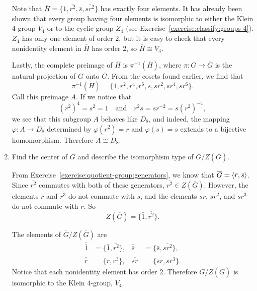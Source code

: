 \begin{enumerate}
\begin{solution}
    Note that
    $\overline{H} = \{1, \overline{r^2}, \bar{s}, \overline{sr^2}\}$
    has exactly four elements. It has already been shown that every
    group having four elements is isomorphic to either the Klein
    4-group $V_4$ or to the cyclic group $Z_4$ (see
    Exercise~\ref{exercise:classify:groups-4}). $Z_4$ has only one
    element of order $2$, but it is easy to check that every
    nonidentity element in $\overline{H}$ has order $2$, so
    $\overline{H}\cong V_4$.

    Lastly, the complete preimage of $\overline{H}$ is
    $\pi^{-1}(\overline{H})$, where $\pi\colon G\to\overline{G}$ is
    the natural projection of $G$ onto $\overline{G}$. From the cosets
    found earlier, we find that
    \begin{equation*}
      \pi^{-1}(\overline{H})
      = \{1, r^2, r^4, r^6, s, sr^2, sr^4, sr^6\}.
    \end{equation*}
    Call this preimage $A$. If we notice that
    \begin{equation*}
      (r^2)^4 = s^2 = 1
      \quad\text{and}\quad
      r^2s = sr^{-2} = s(r^2)^{-1},
    \end{equation*}
    we see that this subgroup $A$ behaves like $D_8$, and indeed, the
    mapping $\varphi\colon A\to D_8$ determined by $\varphi(r^2) = r$
    and $\varphi(s) = s$ extends to a bijective
    homomorphism. Therefore $A\cong D_8$.
  \end{solution}
\item Find the center of $\overline{G}$ and describe the isomorphism
  type of $\overline{G}/Z(\overline{G})$.
  \begin{solution}
    From Exercise~\ref{exercise:quotient-group:generators}, we know
    that $\overline{G} = \langle{\bar{r}, \bar{s}}\rangle$. Since
    $\overline{r^2}$ commutes with both of these generators,
    $\overline{r^2}\in Z(\overline{G})$. However, the elements
    $\bar{r}$ and $\overline{r^3}$ do not commute with $s$, and the
    elements $\overline{sr}$, $\overline{sr^2}$, and $\overline{sr^3}$
    do not commute with $r$. So
    \begin{equation*}
      Z(\overline{G}) = \{ \bar1, \overline{r^2} \}.
    \end{equation*}

    The elements of $\overline{G}/Z(\overline{G})$ are
    \begin{align*}
      \overline{\overline1}
      &= \{\bar1, \overline{r^2}\},
      & \overline{\overline{s}}
      &= \{\bar{s}, \overline{sr^2}\}, \\
      \overline{\overline{r}}
      &= \{\bar{r}, \overline{r^3}\},
      & \overline{\overline{sr}}
      &= \{\overline{sr}, \overline{sr^3}\}.
    \end{align*}
    Notice that each nonidentity element has order $2$. Therefore
    $\overline{G}/Z(\overline{G})$ is isomorphic to the Klein 4-group,
    $V_4$.
  \end{solution}
\end{enumerate}

